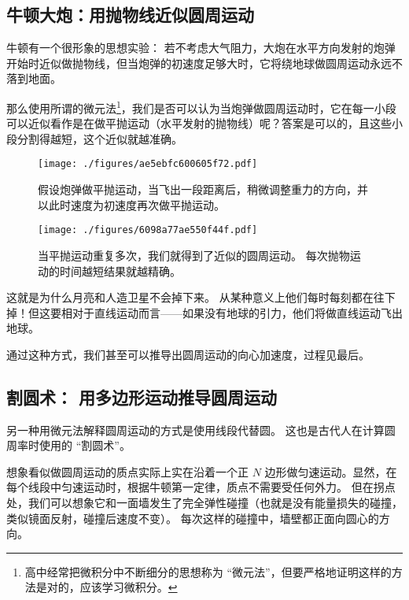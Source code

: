 

\begin{issues}
\issueDraft
\end{issues}

\subsection{牛顿大炮：用抛物线近似圆周运动}
牛顿有一个很形象的思想实验： 若不考虑大气阻力，大炮在水平方向发射的炮弹开始时近似做抛物线，但当炮弹的初速度足够大时，它将绕地球做圆周运动永远不落到地面。


那么使用所谓的微元法\footnote{高中经常把微积分中不断细分的思想称为 “微元法”，但要严格地证明这样的方法是对的，应该学习微积分。}，我们是否可以认为当炮弹做圆周运动时，它在每一小段可以近似看作是在做平抛运动（水平发射的抛物线）呢？答案是可以的，且这些小段分割得越短，这个近似就越准确。

\begin{figure}[ht]
\centering
\texttt{[image: ./figures/ae5ebfc600605f72.pdf]}
\caption{假设炮弹做平抛运动，当飞出一段距离后，稍微调整重力的方向，并以此时速度为初速度再次做平抛运动。} \label{fig_CMintr_2}
\end{figure}



\begin{figure}[ht]
\centering
\texttt{[image: ./figures/6098a77ae550f44f.pdf]}
\caption{当平抛运动重复多次，我们就得到了近似的圆周运动。 每次抛物运动的时间越短结果就越精确。} \label{fig_CMintr_3}
\end{figure}



这就是为什么月亮和人造卫星不会掉下来。 从某种意义上他们每时每刻都在往下掉！但这要相对于直线运动而言——如果没有地球的引力，他们将做直线运动飞出地球。

通过这种方式，我们甚至可以推导出圆周运动的向心加速度，过程见最后。


\subsection{割圆术： 用多边形运动推导圆周运动}
另一种用微元法解释圆周运动的方式是使用线段代替圆。 这也是古代人在计算圆周率时使用的 “割圆术”。

想象看似做圆周运动的质点实际上实在沿着一个正 $N$ 边形做匀速运动。显然，在每个线段中匀速运动时，根据牛顿第一定律，质点不需要受任何外力。 但在拐点处，我们可以想象它和一面墙发生了完全弹性碰撞（也就是没有能量损失的碰撞，类似镜面反射，碰撞后速度不变）。 每次这样的碰撞中，墙壁都正面向圆心的方向。

